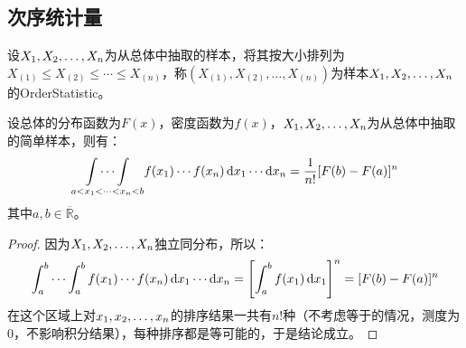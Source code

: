 \subsection{次序统计量}
\begin{definition}
	设$X_1, X_2, \dots, X_{n}$为从总体中抽取的样本，将其按大小排列为$X_{(1)}\leqslant X_{(2)}\leqslant\cdots\leqslant X_{(n)}$，称$(X_{(1)},X_{(2)},\dots,X_{(n)})$为样本$X_1, X_2, \dots, X_{n}$的\gls{OrderStatistic}。
\end{definition}
\begin{lemma}\label{lem:OrderStatistics}
	设总体的分布函数为$F(x)$，密度函数为$f(x)$，$X_1, X_2, \dots, X_{n}$为从总体中抽取的简单样本，则有：
	\begin{equation*}
		\underset{a<x_1<\cdots<x_n<b}{\int\cdots\int}f(x_1)\cdots f(x_n)\mathop{}\!\mathrm{d} x_1\cdots\mathop{}\!\mathrm{d} x_n=\frac{1}{n!}[F(b)-F(a)]^n
	\end{equation*}
	其中$a,b\in\overline{\mathbb{R}}$。
\end{lemma}
\begin{proof}
	因为$X_1, X_2, \dots, X_{n}$独立同分布，所以：
	\begin{equation*}
		\int_{a}^{b}\cdots\int_{a}^{b}f(x_1)\cdots f(x_n)\mathop{}\!\mathrm{d} x_1\cdots\mathop{}\!\mathrm{d} x_n=\left[\int_{a}^{b}f(x_1)\mathop{}\!\mathrm{d} x_1\right]^n=[F(b)-F(a)]^n
	\end{equation*}
	在这个区域上对$x_1, x_2, \dots, x_{n}$的排序结果一共有$n!$种（不考虑等于的情况，测度为$0$，不影响积分结果），每种排序都是等可能的，于是结论成立。
\end{proof}
